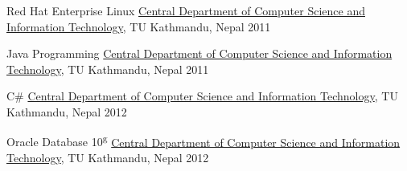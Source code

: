 

\begin{cvhonors}

  \cvhonor
    {Red Hat Enterprise Linux} %
    {\href{http://cdcsit.edu.np/}{Central Department of Computer Science and Information Technology}, TU} %
    {Kathmandu, Nepal} %
    {2011} %

  \cvhonor
    {Java Programming} %
    {\href{http://cdcsit.edu.np/}{Central Department of Computer Science and Information Technology}, TU} %
    {Kathmandu, Nepal} %
    {2011} %

  \cvhonor
    {C\#} %
    {\href{http://cdcsit.edu.np/}{Central Department of Computer Science and Information Technology}, TU} %
    {Kathmandu, Nepal} %
    {2012} %

  \cvhonor
    {Oracle Database 10\textsuperscript{g}} %
    {\href{http://cdcsit.edu.np/}{Central Department of Computer Science and Information Technology}, TU} %
    {Kathmandu, Nepal} %
    {2012} %

\end{cvhonors}
